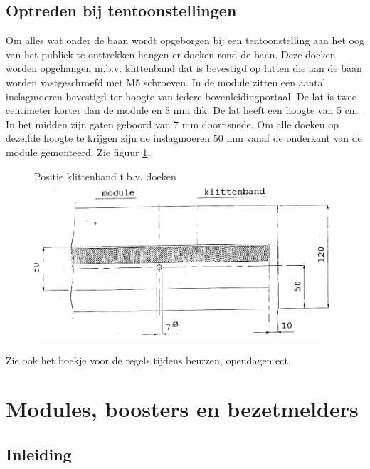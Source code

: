 \documentclass[12pt,a4paper]{report}
\begin{document}
\section{Optreden bij tentoonstellingen}

Om alles wat onder de baan wordt opgeborgen bij een tentoonstelling aan het oog van het publiek te onttrekken hangen er doeken rond de baan. Deze doeken worden opgehangen m.b.v. klittenband dat is bevestigd op latten die aan de baan worden vastgeschroefd met M5 schroeven. In de module zitten een aantal inslagmoeren bevestigd ter hoogte van iedere bovenleidingportaal. De lat is twee centimeter korter dan de module en 8 mm dik. De lat heeft een hoogte van 5 cm. In het midden zijn gaten geboord van 7 mm doornsnede. Om alle doeken op dezelfde hoogte te krijgen zijn de inslagmoeren 50 mm vanaf de onderkant van de module gemonteerd. Zie figuur \ref{figuur17}.

\begin{figure}[!ht]
  \captionbox
  {Positie klittenband t.b.v. doeken\label{figuur17}}
  {\includegraphics[scale=0.4]{images/rcu_figuur17}}
\end{figure}

Zie ook het boekje voor de regels tijdens beurzen, opendagen ect.

\chapter{Modules, boosters en bezetmelders}
\label{ch:electronica}
\section{Inleiding}
\end{document}
